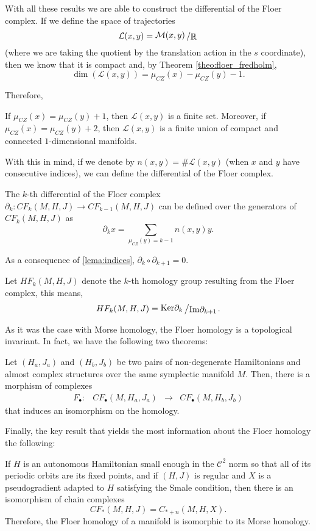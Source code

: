 With all these results we are able to construct the differential of the Floer complex. If we define the space of trajectories
\[\mathcal{L}(x,y) = \quocient{\mathcal{M}(x,y)}{\R}\]
(where we are taking the quotient by the translation action in the $s$ coordinate), then we know that it is compact and, by Theorem \ref{theo:floer_fredholm},
\[\dim(\mathcal{L}(x,y)) = \mu_{CZ}(x)-\mu_{CZ}(y)-1 .\]

Therefore,

\begin{lema} \label{lema:indices}
If $\mu_{CZ}(x) = \mu_{CZ}(y) + 1$, then $\mathcal{L}(x,y)$ is a finite set. Moreover, if $\mu_{CZ}(x) = \mu_{CZ}(y) + 2$, then $\mathcal{L}(x,y)$ is a finite union of compact and connected $1$-dimensional manifolds.
\end{lema}

With this in mind, if we denote by $n(x,y) = \# \mathcal{L}(x,y)$ (when $x$ and $y$ have consecutive indices), we can define the differential of the Floer complex.

\begin{deff}
The $k$-th differential of the Floer complex $\partial_k : CF_k(M,H,J) \rightarrow CF_{k-1}(M,H,J)$ can be defined over the generators of $CF_k(M,H,J)$ as
\[\partial_kx = \sum_{\mu_{CZ}(y) = k-1} n(x,y)y .\]
\end{deff}

As a consequence of \ref{lema:indices}, $\partial_k \circ \partial_{k+1} = 0$.

Let $HF_k(M,H,J)$ denote the $k$-th homology group resulting from the Floer complex, this means,
\[HF_k(M,H,J) = \quocient{\mathrm{Ker}\partial_k}{\mathrm{Im}\partial_{k+1}} .\]

As it was the case with Morse homology, the Floer homology is a topological invariant. In fact, we have the following two theorems:

\begin{theo} \label{theo:invariance}
Let $(H_a,J_a)$ and $(H_b,J_b)$ be two pairs of non-degenerate Hamiltonians and almost complex structures over the same symplectic manifold $M$. Then, there is a morphism of complexes
\[\begin{array}{rccc} F_{\bullet} : & CF_{\bullet}(M,H_a,J_a) & \longrightarrow & CF_{\bullet}(M,H_b,J_b) \end{array} \]
that induces an isomorphism on the homology.
\end{theo}

Finally, the key result that yields the most information about the Floer homology the following:

\begin{theo} \label{theo:floer_morse}
If $H$ is an autonomous Hamiltonian small enough in the $\mathcal{C}^2$ norm so that all of its periodic orbits are its fixed points, and if $(H,J)$ is regular and $X$ is a pseudogradient adapted to $H$ satisfying the Smale condition, then there is an isomorphism of chain complexes
\[CF_{\ast}(M,H,J) = C_{\ast+n}(M,H,X).\]
Therefore, the Floer homology of a manifold is isomorphic to its Morse homology.
\end{theo}
